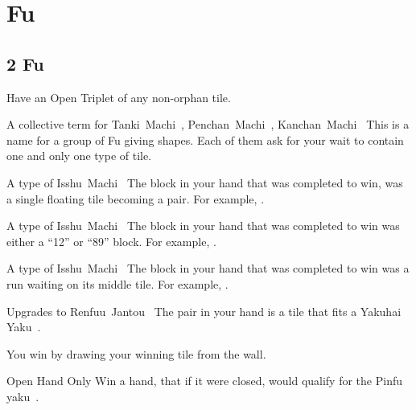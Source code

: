 \section{Fu}\label{core:sec:fu}

\subsection{2 Fu}\label{core:ssec:2-fu}

	{}
	{Have an Open Triplet of any non-orphan tile. }

	{\upgradesto A collective term for Tanki~Machi~, Penchan~Machi~, Kanchan~Machi~}
	{This is a name for a group of Fu giving shapes. Each of them ask for your wait to contain one and only one type of tile.}

	{\upgradesfrom A type of Isshu~Machi~}
	{The block in your hand that was completed to win, was a single floating tile becoming a pair. For example, .}

	{\upgradesfrom A type of Isshu~Machi~}
	{The block in your hand that was completed to win was either a ``12'' or ``89'' block. For example, .}

	{\upgradesfrom A type of Isshu~Machi~}
	{The block in your hand that was completed to win was a run waiting on its middle tile. For example, .}

	{\upgradesto Upgrades to Renfuu~Jantou~}
	{The pair in your hand is a tile that fits a Yakuhai Yaku~.}

	{}
	{You win by drawing your winning tile from the wall.}

	{\symbalert Open Hand Only}
	{Win a hand, that if it were closed, would qualify for the Pinfu yaku~.}


